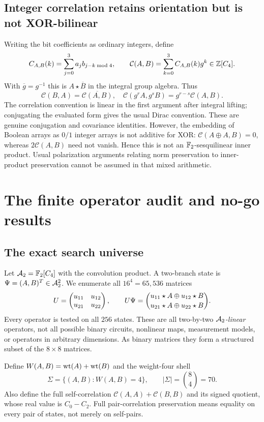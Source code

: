 \subsection{Integer correlation retains orientation but is not XOR-bilinear}
Writing the bit coefficients as ordinary integers, define
\begin{equation}\label{eq:correlation}
 C_{A,B}(k)=\sum_{j=0}^3 a_j b_{j-k\bmod4},\qquad
 \mathcal C(A,B)=\sum_{k=0}^3 C_{A,B}(k)g^k\in\mathbb Z[C_4].
\end{equation}
With $\overline g=g^{-1}$ this is $A\star\overline B$ in the integral group algebra. Thus
\begin{equation}
 \mathcal C(B,A)=\overline{\mathcal C(A,B)},\quad
 \mathcal C(g^rA,g^sB)=g^{r-s}\mathcal C(A,B).
\end{equation}
The correlation convention is linear in the first argument after integral lifting; conjugating the evaluated form gives the usual Dirac convention. These are genuine conjugation and covariance identities. However, the embedding of Boolean arrays as $0/1$ integer arrays is not additive for XOR: $\mathcal C(A\oplus A,B)=0$, whereas $2\mathcal C(A,B)$ need not vanish. Hence this is not an $\mathbb F_2$-sesquilinear inner product. Usual polarization arguments relating norm preservation to inner-product preservation cannot be assumed in that mixed arithmetic.

\section{The finite operator audit and no-go results}\label{sec:finite}
\subsection{The exact search universe}
Let $\mathcal A_2=\mathbb F_2[C_4]$ with the convolution product. A two-branch state is $\Psi=(A,B)^T\in\mathcal A_2^2$. We enumerate all $16^4=65{,}536$ matrices
\begin{equation}
 U=\begin{pmatrix}u_{11}&u_{12}\\u_{21}&u_{22}\end{pmatrix},\qquad
 U\Psi=\binom{u_{11}\star A\oplus u_{12}\star B}{u_{21}\star A\oplus u_{22}\star B}.
\end{equation}
Every operator is tested on all $256$ states. These are all two-by-two \emph{$\mathcal A_2$-linear} operators, not all possible binary circuits, nonlinear maps, measurement models, or operators in arbitrary dimensions. As binary matrices they form a structured subset of the $8\times8$ matrices.

Define $W(A,B)=\operatorname{wt}(A)+\operatorname{wt}(B)$ and the weight-four shell
\begin{equation}
 \Sigma=\{(A,B):W(A,B)=4\},\qquad |\Sigma|=\binom84=70.
\end{equation}
Also define the full self-correlation $\mathcal C(A,A)+\mathcal C(B,B)$ and its signed quotient, whose real value is $C_0-C_2$. Full pair-correlation preservation means equality on every pair of states, not merely on self-pairs.

